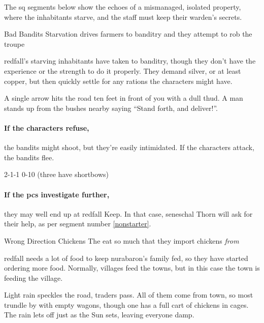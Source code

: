 The \gls{sq} \glspl{segment} below show the echoes of a mismanaged, isolated property, where the inhabitants starve, and the staff must keep their \gls{warden}'s secrets.

{Bad Bandits}%
{Starvation drives  farmers to banditry and they attempt to rob the troupe}%

\Gls{redfall}'s starving inhabitants have taken to banditry, though they don't have the experience or the strength to do it properly.
They demand silver, or at least copper, but then quickly settle for any \glspl{ration} the characters might have.

\begin{boxtext}
  A single arrow hits the road ten feet in front of you with a dull thud.
  A man stands up from the bushes nearby saying ``Stand forth, and deliver!''.
\end{boxtext}

\paragraph{If the characters refuse,}
the bandits might shoot, but they're easily intimidated.
If the characters attack, the bandits flee.

%
  {{2}{-1}{-1}}%
  {{0}{-1}{0}}%
  {%
    \Dagger
  }%
  {}%
  {(three have shortbows)}%
  {}%

\paragraph{If the \glspl{pc} investigate further,}
they may well end up at \gls{redfall} Keep.
In that case, \gls{seneschal} Thorn will ask for their help, as per \gls{segment} number \vref{nonstarter}.

{Wrong Direction Chickens}%
{The   eat so much that they import chickens \emph{from} }%

\Gls{redfall} needs a lot of food to keep \gls{nurabaron}'s family fed, so they have started ordering more food.
Normally, \glspl{village} feed the towns, but in this case the town is feeding the \gls{village}.

\begin{boxtext}
  Light rain speckles the road, traders pass.
  All of them come from \gls{town}, so most trundle by with empty wagons, though one has a full cart of chickens in cages.
  The rain lets off just as the Sun sets, leaving everyone damp.
\end{boxtext}

